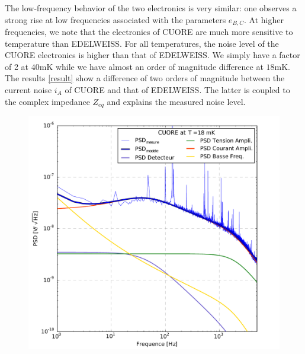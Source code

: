 The low-frequency behavior of the two electronics is very similar: one observes a strong rise at low frequencies associated with the parameters $e_{B,C}$. At higher frequencies, we note that the electronics of CUORE are much more sensitive to temperature than EDELWEISS. For all temperatures, the noise level of the CUORE electronics is higher than that of EDELWEISS. We simply have a factor of 2 at $40$mK while we have almost an order of magnitude difference at $18$mK. The results \ref{result} show a difference of two orders of magnitude between the current noise $i_A$ of CUORE and that of EDELWEISS. The latter is coupled to the complex impedance $Z_{eq}$ and explains the measured noise level.

\begin{figure}[!ht]
\begin{minipage}{0.49\textwidth}
\includegraphics[width=\textwidth]{Images/cuore_18.pdf}
\end{minipage}
\hfill
\begin{minipage}{0.49\textwidth}

\end{minipage}
\end{figure}
